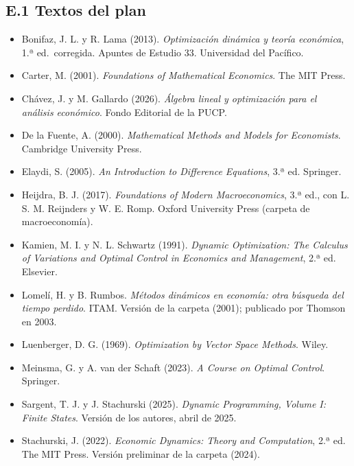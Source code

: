 \documentclass[11pt,a4paper]{article}
\begin{document}
\subsection*{E.1 Textos del plan}
{\small
\begin{itemize}[leftmargin=1.4em,itemsep=1pt,label={}]
\item Bonifaz, J. L. y R. Lama (2013). \emph{Optimización dinámica y teoría económica}, 1.ª ed.\ corregida. Apuntes de Estudio 33. Universidad del Pacífico.
\item Carter, M. (2001). \emph{Foundations of Mathematical Economics}. The MIT Press.
\item Chávez, J. y M. Gallardo (2026). \emph{Álgebra lineal y optimización para el análisis económico}. Fondo Editorial de la PUCP.
\item De la Fuente, A. (2000). \emph{Mathematical Methods and Models for Economists}. Cambridge University Press.
\item Elaydi, S. (2005). \emph{An Introduction to Difference Equations}, 3.ª ed. Springer.
\item Heijdra, B. J. (2017). \emph{Foundations of Modern Macroeconomics}, 3.ª ed., con L. S. M. Reijnders y W. E. Romp. Oxford University Press (carpeta de macroeconomía).
\item Kamien, M. I. y N. L. Schwartz (1991). \emph{Dynamic Optimization: The Calculus of Variations and Optimal Control in Economics and Management}, 2.ª ed. Elsevier.
\item Lomelí, H. y B. Rumbos. \emph{Métodos dinámicos en economía: otra búsqueda del tiempo perdido}. ITAM. Versión de la carpeta (2001); publicado por Thomson en 2003.
\item Luenberger, D. G. (1969). \emph{Optimization by Vector Space Methods}. Wiley.
\item Meinsma, G. y A. van der Schaft (2023). \emph{A Course on Optimal Control}. Springer.
\item Sargent, T. J. y J. Stachurski (2025). \emph{Dynamic Programming, Volume I: Finite States}. Versión de los autores, abril de 2025.
\item Stachurski, J. (2022). \emph{Economic Dynamics: Theory and Computation}, 2.ª ed. The MIT Press. Versión preliminar de la carpeta (2024).
\end{itemize}
}
\end{document}
